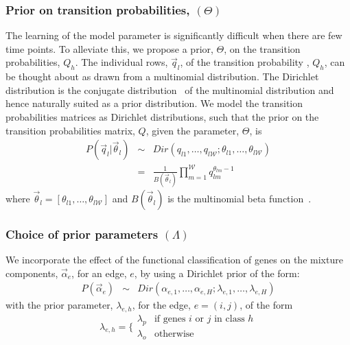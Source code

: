 \documentclass{bioinfo}
\begin{document}
\begin{methods}
\subsubsection{Prior on transition probabilities,  $(\Theta)$} 
\label{sec:bayesian-approach}
The learning of the model parameter is significantly difficult when
there are few time points. To alleviate this, we propose a prior, $\Theta$, on
the transition probabilities, $Q_{h}$.  %
The individual rows, $\vec{q}_{l}$, of the transition
probability , $Q_{h}$, can be thought about as drawn from a multinomial
distribution. The Dirichlet distribution is the conjugate 
distribution~\citep{Gelman03bayesian}  of the multinomial distribution
and hence naturally suited as a prior distribution. We model the
transition probabilities matrices as Dirichlet distributions, 
such that  the prior on the transition probabilities matrix, $Q$, 
given the parameter, $\Theta$, is
\begin{eqnarray}
  \label{eq:q_prior}
  P(\vec{q}_{l} | \vec{\theta}_{l}) &\sim& Dir(q_{l1}, \ldots, q_{l\mathcal{W}} ;
  \theta_{l1},\ldots, \theta_{l\mathcal{W}}) \\
&=& \frac{1}{B(\vec{\theta}_{l})} \prod_{m=1}^{\mathcal{W}} q_{lm}^{\theta_{lm}-1}
\end{eqnarray}
where $\vec{\theta}_{l}=[\theta_{l1},\ldots,\theta_{l\mathcal{W}}]$ and
$B(\vec{\theta}_{l})$ is the multinomial beta
function~\citep{Gelman03bayesian}.


\subsubsection{Choice of prior parameters $(\Lambda)$}
\label{sec:choice-prior-param}
We incorporate the effect of the functional classification of
genes on the mixture components,
$\vec{\alpha}_e$, for an edge, $e$, by using a Dirichlet prior of the form:
\begin{eqnarray}
  \label{eq:hier-prior}
  P(\vec{\alpha}_e) &\sim& Dir(\alpha_{e,1},\ldots, \alpha_{e,H};
  \lambda_{e,1},\ldots, \lambda_{e,H}) 
\end{eqnarray}
with the prior parameter, $\lambda_{e,h}$, for the edge, $e=(i,j)$, of the
form 
\begin{equation}
  \label{eq:mixture-prior}
  \lambda_{e,h} = \Big\{ \begin{array}{ll}
                       \lambda_p & \textrm{if genes }  i \textrm{ or } j
                       \textrm{ in class } h \\
                       \lambda_o & \textrm{otherwise}
                       \end{array}
\end{equation}


\end{methods}
\end{document}
